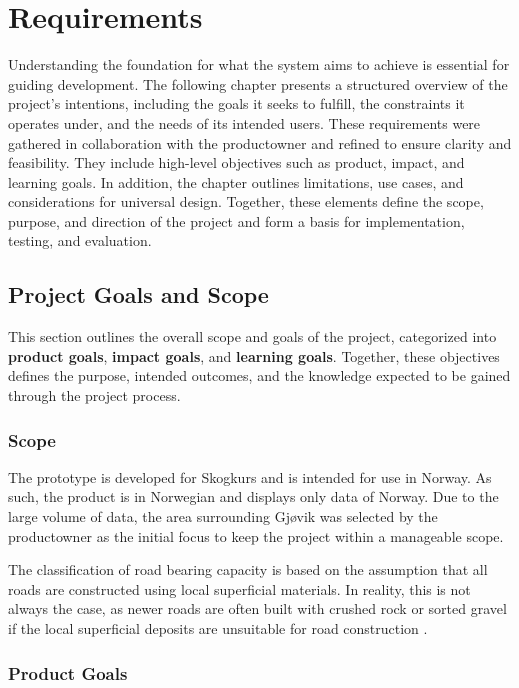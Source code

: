 \chapter{Requirements}\label{chap:requirements}

Understanding the foundation for what the system aims to achieve is essential for guiding development. The following chapter presents a structured overview of the project's intentions, including the goals it seeks to fulfill, the constraints it operates under, and the needs of its intended users. These requirements were gathered in collaboration with the \gls{productowner} and refined to ensure clarity and feasibility. They include high-level objectives such as product, impact, and learning goals. In addition, the chapter outlines limitations, use cases, and considerations for universal design. Together, these elements define the scope, purpose, and direction of the project and form a basis for implementation, testing, and evaluation.

\section{Project Goals and Scope}

This section outlines the overall scope and goals of the project, categorized into \textbf{product goals}, \textbf{impact goals}, and \textbf{learning goals}. Together, these objectives defines the purpose, intended outcomes, and the knowledge expected to be gained through the project process.

\subsection{Scope}\label{subsec:req:scope}

The prototype is developed for Skogkurs and is intended for use in Norway. As such, the product is in Norwegian and displays only data of Norway. Due to the large volume of data, the area surrounding Gjøvik was selected by the \gls{productowner} as the initial focus to keep the project within a manageable scope.

The classification of road bearing capacity is based on the assumption that all roads are constructed using local superficial materials. In reality, this is not always the case, as newer roads are often built with crushed rock or sorted gravel if the local superficial deposits are unsuitable for road construction \cite{fjeld2023trafficability}.

\subsection{Product Goals}\label{subsec:req:productgoals}

